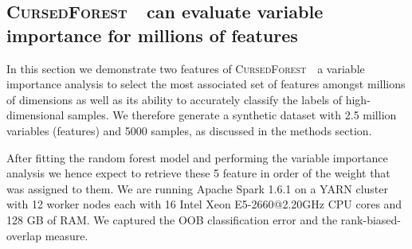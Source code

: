 \documentclass[10pt,letterpaper]{article}
\newcommand{\cursedforest}{\textsc{CursedForest}\ }
\newcommand{\mtry}{{\texttt mtry\ }}
\let\oldmarginpar\marginpar
\renewcommand\marginpar[1]{\-\oldmarginpar[\raggedleft\footnotesize #1]%
{\raggedright\footnotesize #1}}
\begin{document}
\subsection{\cursedforest\ can evaluate variable importance for millions of features}\label{synthetic}
In this section we demonstrate two features of \cursedforest\, a variable importance analysis to select the most
associated set of features amongst millions of dimensions as well as its ability to accurately classify the labels of
high-dimensional samples.  We therefore generate a synthetic dataset with 2.5 million variables (features) and 5000
samples, as discussed in the methods section.

After fitting the random forest model and performing the variable importance analysis we hence expect to retrieve these
5 feature in order of the weight that was assigned to them.  We are running Apache Spark 1.6.1 on a YARN cluster with 12
worker nodes each with 16 Intel Xeon E5-2660@2.20GHz CPU cores and 128 GB of RAM.  We captured the OOB 
classification error and the rank-biased-overlap
\cite[]{Webber.et.al.2010} measure.



\end{document}
